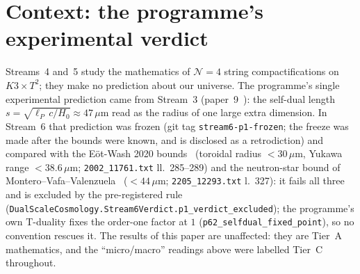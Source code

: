 \documentclass[11pt,a4paper]{article}
\theoremstyle{remark}
\newcommand{\lean}[1]{\texttt{#1}}
\begin{document}
\section{Context: the programme's experimental verdict}
\label{sec:context}
Streams~4 and~5 study the mathematics of $\mathcal{N}=4$ string compactifications on $K3\times T^2$; they
make no prediction about our universe. The programme's single experimental prediction came from
Stream~3 (paper~9~\cite{Callens2026Paper9}): the self-dual length $s=\sqrt{\ell_P\,c/H_0}\approx47\,\mu$m
read as the radius of one large extra dimension. In Stream~6 that prediction was frozen (git tag
\texttt{stream6-p1-frozen}; the freeze was made after the bounds were known, and is disclosed as a
retrodiction) and compared with the Eöt-Wash 2020 bounds~\cite{LeeAdelberger2020} (toroidal radius
$<30\,\mu$m, Yukawa range $<38.6\,\mu$m; \texttt{2002\_11761.txt} ll.~285--289) and the neutron-star bound
of Montero--Vafa--Valenzuela~\cite{MonteroVafaValenzuela2023} ($<44\,\mu$m; \texttt{2205\_12293.txt}
l.~327): it fails all three and is excluded by the pre-registered rule
(\lean{DualScaleCosmology.Stream6Verdict.p1\_verdict\_excluded}); the programme's own T-duality fixes the
order-one factor at $1$ (\lean{p62\_selfdual\_fixed\_point}), so no convention rescues it. The results of
this paper are unaffected: they are Tier~A mathematics, and the ``micro/macro'' readings above were
labelled Tier~C throughout.

\end{document}
